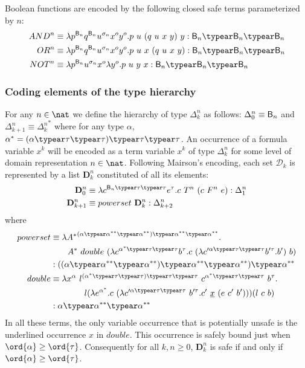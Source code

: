 Boolean functions are encoded by the following closed safe terms parameterized by $n$:
\begin{align*}
AND^n &\equiv \lambda p^{\booltype_n} q^{\booltype_n} u^{\sigma_n} x^o y^o . p~u~(q~u~x~y)~y : \booltype_n\typear\booltype_n\typear\booltype_n \\
OR^n &\equiv \lambda p^{\booltype_n} q^{\booltype_n} u^{\sigma_n} x^o y^o . p~u~x~(q~u~x~y) : \booltype_n\typear\booltype_{n}\typear\booltype_n \\
NOT^n &\equiv \lambda p^{\booltype_n} u^{\sigma_n} x^o \lambda y^o . p~u~y~x : \booltype_n\typear\booltype_n\typear\booltype_n
\end{align*}

\subsubsection{Coding elements of the type hierarchy}
For any $n\in\nat$ we define the hierarchy of type $\Delta_k^n$ as
follows: $\Delta_0^n \equiv \mathsf{B}_n$ and $\Delta_{k+1}^n \equiv
{\Delta_k^n}^*$ where for any type $\alpha$, $\alpha^* = (\alpha
\typear \tau \typear \tau)\typear \tau \typear \tau$. An occurrence
of a formula variable $x^k$ will be encoded as a term variable $x^k$
of type $\Delta_{k}^n$ for some level of domain representation
$n\in\nat$. Following Mairson's  encoding, each set $\mathcal{D}_k$
is represented by a list $\mathbf{D}_k^n$ constituted of all its
elements:
\begin{align*}
\mathbf{D}_0^n &\equiv \lambda c^{\booltype_n \typear \tau \typear \tau} e^\tau . c~T^n~(c~F^n~e) : \Delta_1^n \\
\mathbf{D}_{k+1}^n &\equiv powerset~\mathbf{D}_k^n : \Delta_{k+2}^n
\end{align*}
where
\begin{align*}
  powerset &\equiv \lambda {A^*}^{(\alpha \typear \alpha^{**} \typear \alpha^{**}) \typear \alpha^{**} \typear \alpha^{**}}. \\
&\qquad  A^*~double~(\lambda c^{\alpha^* \typear \tau\typear \tau} b^\tau . c~(\lambda c'^{\alpha\typear \tau\typear \tau} b'^\tau.b')~b)\\
 &: ((\alpha \typear \alpha^{**} \typear \alpha^{**}) \typear \alpha^{**} \typear \alpha^{**})\typear \alpha^{**} \\
  double &\equiv \lambda x^\alpha~l^{(\alpha^* \typear \tau\typear \tau)\typear \tau\typear \tau}~ c^{\alpha^*\typear \tau\typear \tau}~b^\tau. \\
  & \qquad \qquad l(\lambda e^{\alpha^*}.c~(\lambda c'^{\alpha\typear \tau\typear \tau}~ b'^\tau.c'~\underline{x}~(e~c'~b')))(l~c~b)\\
 &: \alpha \typear \alpha^{**} \typear \alpha^{**}
\end{align*}
In all these terms, the only variable occurrence that is potentially
unsafe is the underlined occurrence $x$ in $double$. This occurrence
is safely bound just when $\ord{\alpha} \geq \ord{\tau}$.
Consequently for all $k,n\geq0$, $\mathbf{D}_k^n$ is safe if and
only if $\ord{\alpha} \geq \ord{\tau}$.


